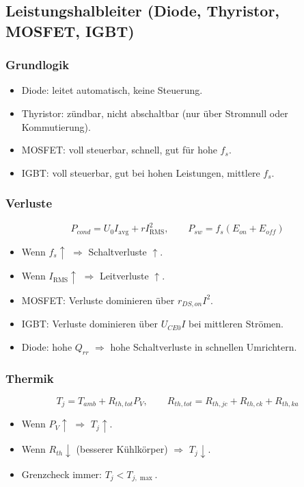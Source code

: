 \subsection{Leistungshalbleiter (Diode, Thyristor, MOSFET, IGBT)}

\subsubsection{Grundlogik}

\begin{itemize}
\item Diode: leitet automatisch, keine Steuerung.
\item Thyristor: zündbar, nicht abschaltbar (nur über Stromnull oder Kommutierung).
\item MOSFET: voll steuerbar, schnell, gut für hohe $f_s$.
\item IGBT: voll steuerbar, gut bei hohen Leistungen, mittlere $f_s$.
\end{itemize}

\subsubsection{Verluste}

\[
P_{cond}=U_0 I_{\mathrm{avg}} + r I_{\mathrm{RMS}}^2,\qquad
P_{sw}=f_s(E_{on}+E_{off})
\]

\begin{itemize}
\item Wenn $f_s\uparrow$ $\Rightarrow$ Schaltverluste $\uparrow$.
\item Wenn $I_{\mathrm{RMS}}\uparrow$ $\Rightarrow$ Leitverluste $\uparrow$.
\item MOSFET: Verluste dominieren über $r_{DS,on}I^2$.
\item IGBT: Verluste dominieren über $U_{CE0}I$ bei mittleren Strömen.
\item Diode: hohe $Q_{rr}$ $\Rightarrow$ hohe Schaltverluste in schnellen Umrichtern.
\end{itemize}

\subsubsection{Thermik}

\[
T_j=T_{amb}+R_{th,tot}P_V,\qquad
R_{th,tot}=R_{th,jc}+R_{th,ck}+R_{th,ka}
\]

\begin{itemize}
\item Wenn $P_V\uparrow$ $\Rightarrow$ $T_j\uparrow$.
\item Wenn $R_{th}\downarrow$ (besserer Kühlkörper) $\Rightarrow$ $T_j\downarrow$.
\item Grenzcheck immer: $T_j<T_{j,\max}$.
\end{itemize}

